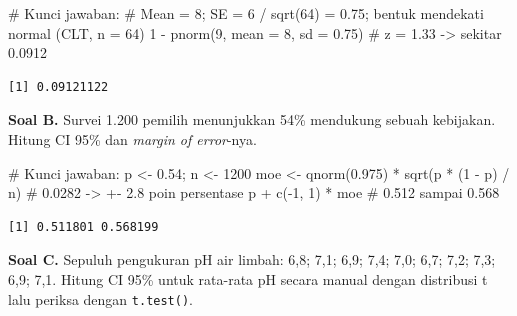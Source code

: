 \documentclass[
  indonesian,
  letterpaper,
]{book}
\newenvironment{Shaded}{\begin{snugshade}}{\end{snugshade}}
\newcommand{\AttributeTok}[1]{\textcolor[rgb]{0.40,0.45,0.13}{#1}}
\newcommand{\CommentTok}[1]{\textcolor[rgb]{0.37,0.37,0.37}{#1}}
\newcommand{\DecValTok}[1]{\textcolor[rgb]{0.68,0.00,0.00}{#1}}
\newcommand{\FloatTok}[1]{\textcolor[rgb]{0.68,0.00,0.00}{#1}}
\newcommand{\FunctionTok}[1]{\textcolor[rgb]{0.28,0.35,0.67}{#1}}
\newcommand{\NormalTok}[1]{\textcolor[rgb]{0.00,0.23,0.31}{#1}}
\newcommand{\OtherTok}[1]{\textcolor[rgb]{0.00,0.23,0.31}{#1}}
\newcommand{\SpecialCharTok}[1]{\textcolor[rgb]{0.37,0.37,0.37}{#1}}
\begin{document}
\begin{Shaded}
\begin{Highlighting}[]
\CommentTok{\# Kunci jawaban:}
\CommentTok{\# Mean = 8; SE = 6 / sqrt(64) = 0.75; bentuk mendekati normal (CLT, n = 64)}
\DecValTok{1} \SpecialCharTok{{-}} \FunctionTok{pnorm}\NormalTok{(}\DecValTok{9}\NormalTok{, }\AttributeTok{mean =} \DecValTok{8}\NormalTok{, }\AttributeTok{sd =} \FloatTok{0.75}\NormalTok{)   }\CommentTok{\# z = 1.33 {-}\textgreater{} sekitar 0.0912}
\end{Highlighting}
\end{Shaded}

\begin{verbatim}
[1] 0.09121122
\end{verbatim}

\textbf{Soal B.} Survei 1.200 pemilih menunjukkan 54\% mendukung sebuah
kebijakan. Hitung CI 95\% dan \emph{margin of error}-nya.

\begin{Shaded}
\begin{Highlighting}[]
\CommentTok{\# Kunci jawaban:}
\NormalTok{p }\OtherTok{\textless{}{-}} \FloatTok{0.54}\NormalTok{; n }\OtherTok{\textless{}{-}} \DecValTok{1200}
\NormalTok{moe }\OtherTok{\textless{}{-}} \FunctionTok{qnorm}\NormalTok{(}\FloatTok{0.975}\NormalTok{) }\SpecialCharTok{*} \FunctionTok{sqrt}\NormalTok{(p }\SpecialCharTok{*}\NormalTok{ (}\DecValTok{1} \SpecialCharTok{{-}}\NormalTok{ p) }\SpecialCharTok{/}\NormalTok{ n)   }\CommentTok{\# 0.0282 {-}\textgreater{} +{-} 2.8 poin persentase}
\NormalTok{p }\SpecialCharTok{+} \FunctionTok{c}\NormalTok{(}\SpecialCharTok{{-}}\DecValTok{1}\NormalTok{, }\DecValTok{1}\NormalTok{) }\SpecialCharTok{*}\NormalTok{ moe                             }\CommentTok{\# 0.512 sampai 0.568}
\end{Highlighting}
\end{Shaded}

\begin{verbatim}
[1] 0.511801 0.568199
\end{verbatim}

\textbf{Soal C.} Sepuluh pengukuran pH air limbah: 6,8; 7,1; 6,9; 7,4;
7,0; 6,7; 7,2; 7,3; 6,9; 7,1. Hitung CI 95\% untuk rata-rata pH secara
manual dengan distribusi t lalu periksa dengan \texttt{t.test()}.
\end{document}

